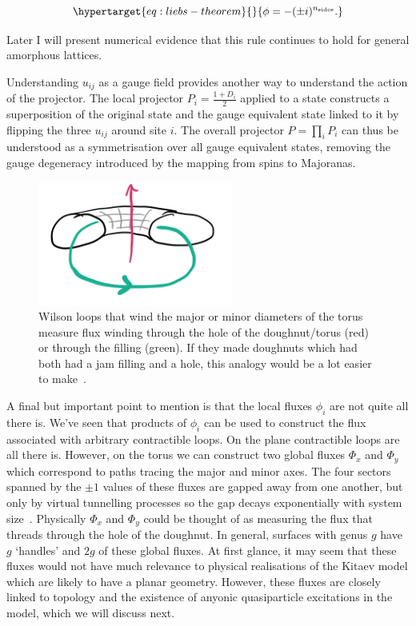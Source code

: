 \begin{equation}\protect\hypertarget{eq:liebs-theorem}{}{\phi = -(\pm i)^{n_{\mathrm{sides}}}.}\label{eq:liebs-theorem}\end{equation}

Later I will present numerical evidence that this rule continues to hold for general amorphous lattices.

Understanding \(u_{ij}\) as a gauge field provides another way to understand the action of the projector. The local projector \(P_i = \frac{1 + D_i}{2}\) applied to a state constructs a superposition of the original state and the gauge equivalent state linked to it by flipping the three \(u_{ij}\) around site \(i\). The overall projector \(P = \prod_i P_i\) can thus be understood as a symmetrisation over all gauge equivalent states, removing the gauge degeneracy introduced by the mapping from spins to Majoranas.

\hypertarget{fig:topological_fluxes}{%
\begin{figure}
\centering
\includegraphics[width=0.57\textwidth,height=\textheight]{figure_code/amk_chapter/topological_fluxes.png}
\caption[{Topological Fluxes}]{Wilson loops that wind the major or minor diameters of the torus measure flux winding through the hole of the doughnut/torus (red) or through the filling (green). If they made doughnuts which had both had a jam filling and a hole, this analogy would be a lot easier to make~\autocite{parkerWhyDoesThis}.}
\label{fig:topological_fluxes}
\end{figure}
}

A final but important point to mention is that the local fluxes \(\phi_i\) are not quite all there is. We've seen that products of \(\phi_i\) can be used to construct the flux associated with arbitrary contractible loops. On the plane contractible loops are all there is. However, on the torus we can construct two global fluxes \(\Phi_x\) and \(\Phi_y\) which correspond to paths tracing the major and minor axes. The four sectors spanned by the \(\pm1\) values of these fluxes are gapped away from one another, but only by virtual tunnelling processes so the gap decays exponentially with system size~\autocite{kitaevAnyonsExactlySolved2006}. Physically \(\Phi_x\) and \(\Phi_y\) could be thought of as measuring the flux that threads through the hole of the doughnut. In general, surfaces with genus \(g\) have \(g\) `handles' and \(2g\) of these global fluxes. At first glance, it may seem that these fluxes would not have much relevance to physical realisations of the Kitaev model which are likely to have a planar geometry. However, these fluxes are closely linked to topology and the existence of anyonic quasiparticle excitations in the model, which we will discuss next.


